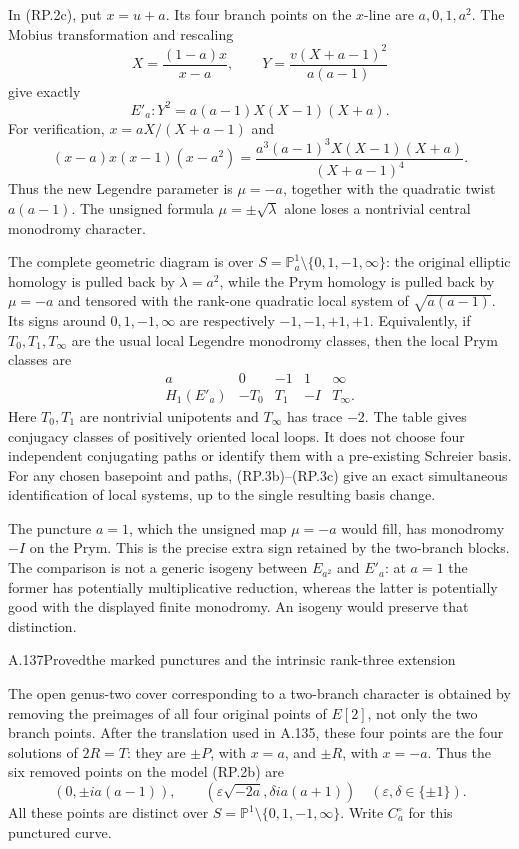 In (RP.2c), put $x=u+a$. Its four branch points on
the $x$-line are $a,0,1,a^2$. The Mobius transformation
and rescaling
\[
       X=\frac{(1-a)x}{x-a},\qquad
       Y=\frac{v(X+a-1)^2}{a(a-1)}
 \tag{RP.3b}
\]
give exactly
\[
       \boxed{\ E'_a:Y^2=a(a-1)X(X-1)(X+a).\ }
 \tag{RP.3c}
\]
For verification, $x=aX/(X+a-1)$ and
\[
 (x-a)x(x-1)(x-a^2)
 =\frac{a^3(a-1)^3 X(X-1)(X+a)}{(X+a-1)^4}.
\]
Thus the new Legendre parameter is $\mu=-a$, together
with the quadratic twist $a(a-1)$. The unsigned formula
$\mu=\pm\sqrt\lambda$ alone loses a nontrivial central
monodromy character.

The complete geometric diagram is over
$S=\mathbb P^1_a\setminus\{0,1,-1,\infty\}$:
the original elliptic homology is pulled back by
$\lambda=a^2$, while the Prym homology is pulled back
by $\mu=-a$ and tensored with the rank-one quadratic
local system of $\sqrt{a(a-1)}$. Its signs around
$0,1,-1,\infty$ are respectively $-1,-1,+1,+1$.
Equivalently, if $T_0,T_1,T_\infty$ are the usual
local Legendre monodromy classes, then the local
Prym classes are
\[
\begin{array}{c|cccc}
 a&0&-1&1&\infty\\ \hline
 H_1(E'_a)&-T_0&T_1&-I&T_\infty.
\end{array}
 \tag{RP.3d}
\]
Here $T_0,T_1$ are nontrivial unipotents and
$T_\infty$ has trace $-2$. The table gives conjugacy
classes of positively oriented local loops. It does
not choose four independent conjugating paths or
identify them with a pre-existing Schreier basis.
For any chosen basepoint and paths, (RP.3b)--(RP.3c)
give an exact simultaneous identification of local
systems, up to the single resulting basis change.

The puncture $a=1$, which the unsigned map $\mu=-a$
would fill, has monodromy $-I$ on the Prym. This is
the precise extra sign retained by the two-branch
blocks. The comparison is not a generic isogeny
between $E_{a^2}$ and $E'_{a}$: at $a=1$ the former
has potentially multiplicative reduction, whereas
the latter is potentially good with the displayed
finite monodromy. An isogeny would preserve that
distinction.

\begin{statement}{A.137}{Proved}{the marked punctures and the intrinsic rank-three extension}
\end{statement}
The open genus-two cover corresponding to a two-branch
character is obtained by removing the preimages of all
four original points of $E[2]$, not only the two branch
points. After the translation used in A.135, these four
points are the four solutions of $2R=T$: they are
$\pm P$, with $x=a$, and $\pm R$, with $x=-a$.
Thus the six removed points on the model (RP.2b) are
\[
 (0,\pm i a(a-1)),\qquad
 (\varepsilon\sqrt{-2a},\delta i a(a+1))
       \quad(\varepsilon,\delta\in\{\pm1\}).
 \tag{RP.5a}
\]
All these points are distinct over
$S=\mathbb P^1\setminus\{0,1,-1,\infty\}$.
Write $C_a^\circ$ for this punctured curve.

